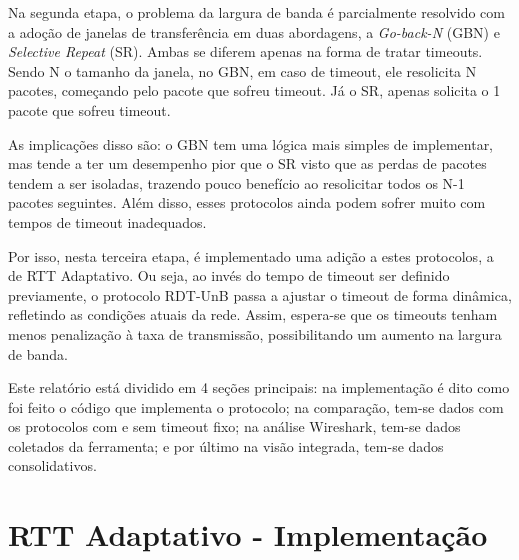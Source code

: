 \documentclass[11pt,a4paper]{article}
\begin{document}
Na segunda etapa, o problema da largura de banda é parcialmente resolvido com a adoção
de janelas de transferência em duas abordagens, a \textit{Go-back-N} (GBN) e
\textit{Selective Repeat} (SR). Ambas se diferem apenas na forma de tratar timeouts.
Sendo N o tamanho da janela, no GBN, em caso de timeout, ele resolicita N pacotes, 
começando pelo pacote que sofreu timeout. Já o SR, apenas solicita o 1 pacote que sofreu
timeout.

As implicações disso são: o GBN tem uma lógica mais simples de implementar, mas tende a
ter um desempenho pior que o SR visto que as perdas de pacotes tendem a ser isoladas,
trazendo pouco benefício ao resolicitar todos os N-1 pacotes seguintes. Além disso,
esses protocolos ainda podem sofrer muito com tempos de timeout inadequados.

Por isso, nesta terceira etapa, é implementado uma adição a estes protocolos,
a de RTT Adaptativo. Ou seja, ao invés do tempo de timeout ser definido previamente,
o protocolo RDT-UnB passa a ajustar o timeout de forma dinâmica, refletindo as condições
atuais da rede. Assim, espera-se que os timeouts tenham menos penalização à taxa de
transmissão, possibilitando um aumento na largura de banda.

Este relatório está dividido em 4 seções principais: na implementação é dito como foi feito o código que implementa o protocolo;
na comparação, tem-se dados com os protocolos com e sem timeout fixo; na análise Wireshark, tem-se dados coletados da ferramenta;
e por último na visão integrada, tem-se dados consolidativos.

\section{RTT Adaptativo - Implementação}

%


\end{document}
